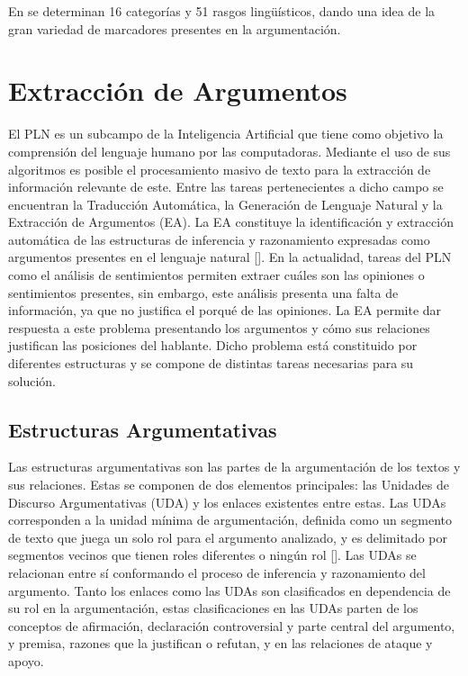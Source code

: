 En
\textcite{venegas2005hacia}
se determinan 16 categorías y 51 rasgos lingüísticos, dando una idea 
de la gran variedad de marcadores presentes en la argumentación.

\section{Extracción de Argumentos}

El PLN es un subcampo de la Inteligencia Artificial que tiene como objetivo la comprensión 
del lenguaje humano por las computadoras. 
Mediante el uso de sus algoritmos es posible el procesamiento masivo de texto para la extracción de información 
relevante de este. Entre las tareas pertenecientes a dicho campo se encuentran la Traducción Automática, 
la Generación de Lenguaje Natural y la Extracción de Argumentos (EA). La EA constituye la identificación y extracción 
automática de las estructuras de inferencia y 
razonamiento expresadas como argumentos presentes en el lenguaje natural [\cite{lawrence2020argument}].
En la actualidad, tareas del PLN como el análisis de sentimientos permiten 
extraer cuáles son las opiniones o sentimientos presentes, sin embargo, este análisis presenta una falta 
de información, ya que no justifica el porqué de las opiniones. La EA permite dar respuesta a este problema presentando
los argumentos y cómo sus relaciones justifican las posiciones del hablante. Dicho problema está constituido por diferentes 
estructuras y se compone de distintas tareas necesarias para su solución.

\subsection{Estructuras Argumentativas}

Las estructuras argumentativas son las partes de la argumentación de los textos y sus relaciones.
Estas se componen de dos elementos principales: las Unidades de Discurso Argumentativas (UDA) y los enlaces
existentes entre estas. Las UDAs corresponden a la unidad mínima de argumentación, definida 
como un segmento de texto que juega un solo rol para el argumento analizado, y es 
delimitado por segmentos vecinos que tienen roles diferentes o ningún rol [\cite{stede2018argumentation}].
Las UDAs se relacionan entre sí conformando el proceso de inferencia y razonamiento del argumento.
Tanto los enlaces como las UDAs son clasificados en dependencia de su rol en la argumentación, estas clasificaciones 
en las UDAs parten de los conceptos de afirmación, declaración controversial y parte central del argumento, y premisa,
razones que la justifican o refutan, y en las relaciones de ataque y apoyo. 

